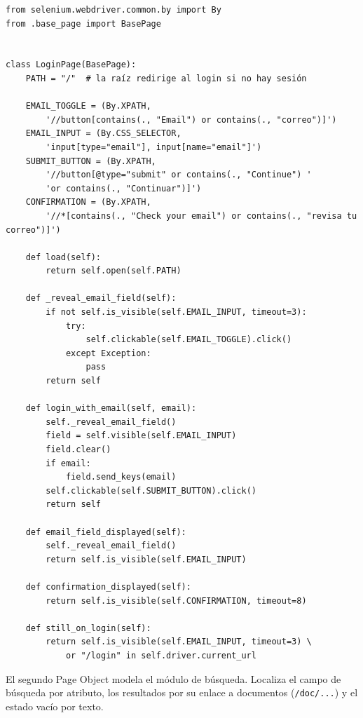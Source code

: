 \documentclass[12pt]{article}
\begin{document}
\begin{lstlisting}[style=py,caption={\texttt{pages/login\_page.py} --- Page Object de autenticación.},captionpos=b]
from selenium.webdriver.common.by import By
from .base_page import BasePage


class LoginPage(BasePage):
    PATH = "/"  # la raíz redirige al login si no hay sesión

    EMAIL_TOGGLE = (By.XPATH,
        '//button[contains(., "Email") or contains(., "correo")]')
    EMAIL_INPUT = (By.CSS_SELECTOR,
        'input[type="email"], input[name="email"]')
    SUBMIT_BUTTON = (By.XPATH,
        '//button[@type="submit" or contains(., "Continue") '
        'or contains(., "Continuar")]')
    CONFIRMATION = (By.XPATH,
        '//*[contains(., "Check your email") or contains(., "revisa tu correo")]')

    def load(self):
        return self.open(self.PATH)

    def _reveal_email_field(self):
        if not self.is_visible(self.EMAIL_INPUT, timeout=3):
            try:
                self.clickable(self.EMAIL_TOGGLE).click()
            except Exception:
                pass
        return self

    def login_with_email(self, email):
        self._reveal_email_field()
        field = self.visible(self.EMAIL_INPUT)
        field.clear()
        if email:
            field.send_keys(email)
        self.clickable(self.SUBMIT_BUTTON).click()
        return self

    def email_field_displayed(self):
        self._reveal_email_field()
        return self.is_visible(self.EMAIL_INPUT)

    def confirmation_displayed(self):
        return self.is_visible(self.CONFIRMATION, timeout=8)

    def still_on_login(self):
        return self.is_visible(self.EMAIL_INPUT, timeout=3) \
            or "/login" in self.driver.current_url
\end{lstlisting}

El segundo Page Object modela el módulo de búsqueda. Localiza el campo de
búsqueda por atributo, los resultados por su enlace a documentos
(\texttt{/doc/...}) y el estado vacío por texto.
\end{document}

